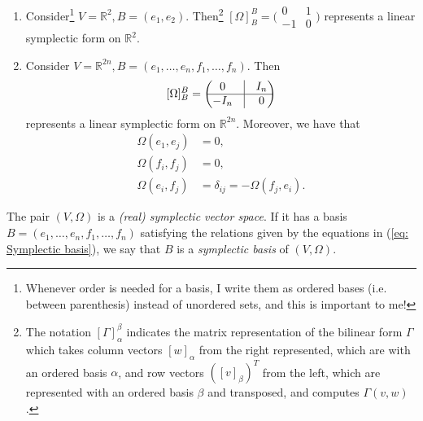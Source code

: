 \documentclass[12pt]{book}
\begin{document}
\begin{Exp}\leavevmode
    \begin{enumerate}[label=\ExpLbl]
    
        \item Consider\footnote{Whenever order is needed for a basis, I write them as ordered bases (i.e. between parenthesis) instead of unordered sets, and this is important to me!} $V=\mathbb{R}^2, B = (e_1, e_2)$. Then\footnote{The notation $[\Gamma]_\alpha^\beta$ indicates the matrix representation of the bilinear form $\Gamma$ which takes column vectors $[w]_\alpha$ from the right represented, which are with an ordered basis $\alpha$, and row vectors $([v]_\beta)^T$ from the left, which are represented with an ordered basis $\beta$ and transposed, and computes $\Gamma(v,w)$.} $[\Omega]_B^B=\big(\begin{smallmatrix} 0 &1 \\ -1 &0 \end{smallmatrix}\big)$ represents a linear symplectic form on $\mathbb{R}^2$.

        \item Consider $V=\mathbb{R}^{2n}, B = (e_1,\dots, e_n,f_1,\dots,f_n)$. Then
            \[
                [\Omega]_B^B = \begin{pmatrix} 0 &\vline &I_n \\ \hline -I_n &\vline &0\end{pmatrix}
            \] 
            represents a linear symplectic form on $\mathbb{R}^{2n}$. Moreover, we have that
                \begin{align}\label{eq: Symplectic basis}
                    \Omega(e_1,e_j)&=0, \nonumber \\
                    \Omega(f_i,f_j) &= 0, \\
                    \Omega(e_i,f_j) &= \delta_{ij} = -\Omega(f_j,e_i) \nonumber.
                \end{align}
    \end{enumerate}
\end{Exp}

\begin{Dfn}\label{Dfn: Symplectic vector space}
    The pair $(V,\Omega)$ is a \emph{(real) symplectic vector space}. If it has a basis $B = (e_1,\dots, e_n,f_1,\dots,f_n)$ satisfying the relations given by the equations in (\ref{eq: Symplectic basis}), we say that $B$ is a \emph{symplectic basis} of $(V,\Omega)$.
\end{Dfn}
\end{document}
